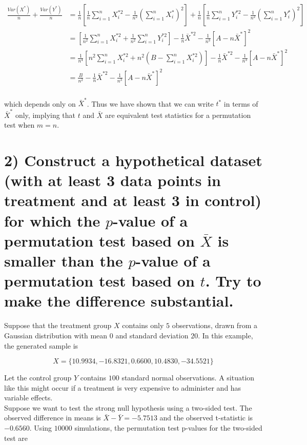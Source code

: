 \documentclass[11pt]{article}
\begin{document}
\begin{align*}
\frac{Var(X^*)}{n} + \frac{Var(Y^*)}{n} &= \frac{1}{n} \left[ \frac1n \sum_{i=1}^n X_i^{*2} - \frac{1}{n^2} \left( \sum_{i=1}^n X_i^*\right)^2 \right] + \frac{1}{n} \left[ \frac1n \sum_{i=1}^n Y_i^{*2} - \frac{1}{n^2} \left( \sum_{i=1}^n Y_i^*\right)^2 \right]\\
& = \left[ \frac{1}{n^2} \sum_{i=1}^n X_i^{*2} + \frac{1}{n^2} \sum_{i=1}^n Y_i^{*2} \right] - \frac1n\bar{X}^{*2} - \frac{1}{n^3} \left[A - n \bar{X}^* \right]^2\\
& = \frac{1}{n^4}\left[ n^2 \sum_{i=1}^n X_i^{*2} + n^2\left(B - \sum_{i=1}^n X_i^{*2}\right) \right] - \frac1n\bar{X}^{*2} - \frac{1}{n^3} \left[A - n \bar{X}^* \right]^2\\
& = \frac{B}{n^2} - \frac1n\bar{X}^{*2} - \frac{1}{n^3} \left[A - n \bar{X}^* \right]^2\\
\end{align*}

\noindent which depends only on $\bar{X}^{*}$. Thus we have shown that we can write $t^*$ in terms of $\bar{X}^*$ only, implying that $t$ and $\bar{X}$ are equivalent test statistics for a permutation test when $m  = n$.


\section*{2) Construct a hypothetical dataset (with at least 3 data points in treatment and at least 3 in control) for which the $p$-value of a permutation test based on $\bar{X}$ is smaller than the $p$-value of a permutation test based on $t$. Try to make the difference substantial.}


Suppose that the treatment group $X$ contains only $5$ observations, drawn from a Gaussian distribution with mean $0$ and standard deviation $20$.  In this example, the generated sample is

$$ X = \{ 10.9934, -16.8321,   0.6600,  10.4830, -34.5521\}$$

Let the control group $Y$ contains $100$ standard normal observations.  A situation like this might occur if a treatment is very expensive to administer and has variable effects.  \\

Suppose we want to test the strong null hypothesis using a two-sided test.  The observed difference in means is $\bar{X} - \bar{Y} = -5.7513$ and the observed t-statistic is $-0.6560$.  Using $10000$ simulations, the permutation test p-values for the two-sided test are
\end{document}
